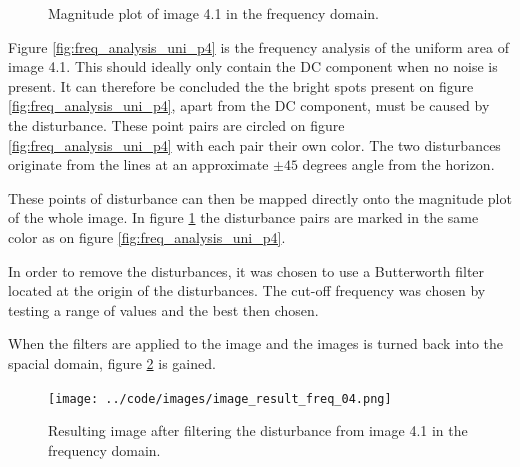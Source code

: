 \begin{figure}[H]
\centering
{}

\caption{Magnitude plot of image 4.1 in the frequency domain.}
\label{fig:freq_analysis_p4}
\end{figure}


Figure \ref{fig:freq_analysis_uni_p4} is the frequency analysis of the uniform area of image 4.1.
This should ideally only contain the DC component when no noise is present.
It can therefore be concluded the the bright spots present on figure \ref{fig:freq_analysis_uni_p4}, apart from the DC component, must be caused by the disturbance.
These point pairs are circled on figure \ref{fig:freq_analysis_uni_p4} with each pair their own color.
The two disturbances originate from the lines at an approximate $\pm 45$ degrees angle from the horizon.

These points of disturbance can then be mapped directly onto the magnitude plot of the whole image.
In figure \ref{fig:freq_analysis_p4} the disturbance pairs are marked in the same color as on figure  \ref{fig:freq_analysis_uni_p4}.


In order to remove the disturbances, it was chosen to use a Butterworth filter located at the origin of the disturbances.
The cut-off frequency was chosen by testing a range of values and the best then chosen.

When the filters are applied to the image and the images is turned back into the spacial domain, figure \ref{fig:result_04} is gained.


\begin{figure}[H]
\centering
\texttt{[image: ../code/images/image\_result\_freq\_04.png]}
\caption{Resulting image after filtering the disturbance from image 4.1 in the frequency domain.}
\label{fig:result_04}
\end{figure}

